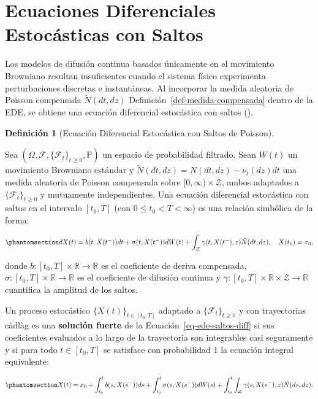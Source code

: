 \documentclass[
  spanish,
  us-letterpaper,
]{scrreprt}
\numberwithin{equation}{section}
\theoremstyle{plain}
\theoremstyle{plain}
\theoremstyle{plain}
\theoremstyle{definition}
\newtheorem{definition}{Definición}[chapter]
\theoremstyle{remark}
\begin{document}
\section{Ecuaciones Diferenciales Estocásticas con
Saltos}\label{ecuaciones-diferenciales-estocuxe1sticas-con-saltos}

Los modelos de difusión continua basados únicamente en el movimiento
Browniano resultan insuficientes cuando el sistema físico experimenta
perturbaciones discretas e instantáneas. Al incorporar la medida
aleatoria de Poisson compensada \(\tilde{N}(dt, dz)\)
Definición~\ref{def-medida-compensada} dentro de la EDE, se obtiene una
ecuación diferencial estocástica con saltos
().

\begin{definition}[Ecuación Diferencial Estocástica con Saltos de
Poisson]\protect\hypertarget{def-ede-saltos}{}\label{def-ede-saltos}

Sea \((\Omega, \mathcal{F}, \{\mathcal{F}_t\}_{t \ge 0}, \mathbb{P})\)
un espacio de probabilidad filtrado. Sean \(W(t)\) un movimiento
Browniano estándar y \(\tilde{N}(dt, dz) = N(dt, dz) - \nu_t(dz)dt\) una
medida aleatoria de Poisson compensada sobre
\([0, \infty) \times \mathcal{Z}\), ambos adaptados a
\(\{\mathcal{F}_t\}_{t \ge 0}\) y mutuamente independientes. Una
ecuación diferencial estocástica con saltos en el intervalo \([t_0, T]\)
(con \(0 \leq t_0 < T < \infty\)) es una relación simbólica de la forma:

\begin{equation}\phantomsection\label{eq-ede-saltos-diff}{
dX(t) = b(t, X(t^-)) dt + \sigma(t, X(t^-)) dW(t) + \int_{\mathcal{Z}} \gamma(t, X(t^-), z) \tilde{N}(dt, dz), \quad X(t_0) = x_0,
}\end{equation}

donde \(b: [t_0, T] \times \mathbb{R} \to \mathbb{R}\) es el coeficiente
de deriva compensada,
\(\sigma: [t_0, T] \times \mathbb{R} \to \mathbb{R}\) es el coeficiente
de difusión continua y
\(\gamma: [t_0, T] \times \mathbb{R} \times \mathcal{Z} \to \mathbb{R}\)
cuantifica la amplitud de los saltos.

Un proceso estocástico \(\{X(t)\}_{t \in [t_0, T]}\) adaptado a
\(\{\mathcal{F}_t\}_{t \ge 0}\) y con trayectorias càdlàg es una
\textbf{solución fuerte} de la Ecuación~\ref{eq-ede-saltos-diff} si sus
coeficientes evaluados a lo largo de la trayectoria son integrables casi
seguramente y si para todo \(t \in [t_0, T]\) se satisface con
probabilidad 1 la ecuación integral equivalente:

\begin{equation}\phantomsection\label{eq-ede-saltos-int}{
X(t) = x_0 + \int_{t_0}^t b(s, X(s^-)) ds + \int_{t_0}^t \sigma(s, X(s^-)) dW(s) + \int_{t_0}^t \int_{\mathcal{Z}} \gamma(s, X(s^-), z) \tilde{N}(ds, dz).
}\end{equation}

\end{definition}
\end{document}
